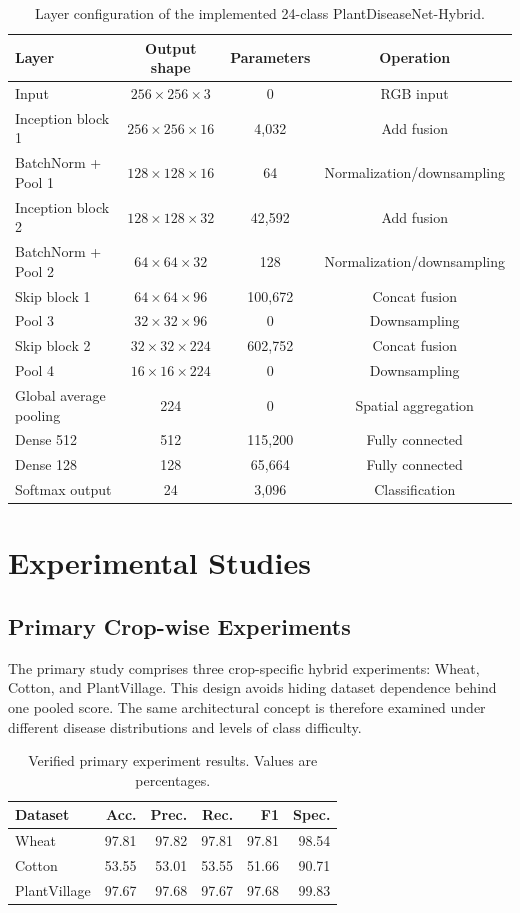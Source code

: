 \documentclass[a4paper,fleqn]{cas-dc}
\begin{document}
\begin{table}[!t]
\centering
\caption{Layer configuration of the implemented 24-class PlantDiseaseNet-Hybrid.}
\label{tab:model}
\begin{tabular}{lccc}
\toprule
Layer & Output shape & Parameters & Operation \\
\midrule
Input & $256\times256\times3$ & 0 & RGB input \\
Inception block 1 & $256\times256\times16$ & 4,032 & Add fusion \\
BatchNorm + Pool 1 & $128\times128\times16$ & 64 & Normalization/downsampling \\
Inception block 2 & $128\times128\times32$ & 42,592 & Add fusion \\
BatchNorm + Pool 2 & $64\times64\times32$ & 128 & Normalization/downsampling \\
Skip block 1 & $64\times64\times96$ & 100,672 & Concat fusion \\
Pool 3 & $32\times32\times96$ & 0 & Downsampling \\
Skip block 2 & $32\times32\times224$ & 602,752 & Concat fusion \\
Pool 4 & $16\times16\times224$ & 0 & Downsampling \\
Global average pooling & 224 & 0 & Spatial aggregation \\
Dense 512 & 512 & 115,200 & Fully connected \\
Dense 128 & 128 & 65,664 & Fully connected \\
Softmax output & 24 & 3,096 & Classification \\
\bottomrule
\end{tabular}
\end{table}

\section{Experimental Studies}
\subsection{Primary Crop-wise Experiments}
The primary study comprises three crop-specific hybrid experiments: Wheat, Cotton, and PlantVillage. This design avoids hiding dataset dependence behind one pooled score. The same architectural concept is therefore examined under different disease distributions and levels of class difficulty.

\begin{table}[!t]
\centering
\caption{Verified primary experiment results. Values are percentages.}
\label{tab:primary}
\begin{tabular}{lrrrrr}
\toprule
Dataset & Acc. & Prec. & Rec. & F1 & Spec. \\
\midrule
Wheat & 97.81 & 97.82 & 97.81 & 97.81 & 98.54 \\
Cotton & 53.55 & 53.01 & 53.55 & 51.66 & 90.71 \\
PlantVillage & 97.67 & 97.68 & 97.67 & 97.68 & 99.83 \\
\bottomrule
\end{tabular}
\end{table}
\end{document}
